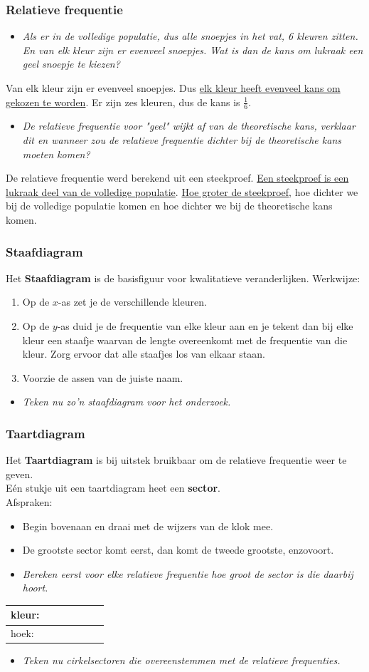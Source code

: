 \documentclass[dutch]{beamer}
\newcommand{\vraag}[1]{\begin{itemize}\item {\it #1}\end{itemize}}
\begin{document}
\begin{frame}
\frametitle{Relatieve frequentie}
\vraag{Als er in de volledige populatie, dus alle snoepjes in het vat, 6 kleuren zitten. En
van elk kleur zijn er evenveel snoepjes. Wat is dan de kans om lukraak een geel snoepje te kiezen?}
\pause
Van elk kleur zijn er evenveel snoepjes. Dus \uline{elk kleur heeft evenveel kans om gekozen te worden}. Er zijn zes kleuren, dus de kans is $\frac{1}{6}$.
\pause
\vraag{De relatieve frequentie voor "geel" wijkt af van de theoretische kans, verklaar dit en wanneer
zou de relatieve frequentie dichter bij de theoretische kans moeten komen?}
\pause
De relatieve frequentie werd berekend uit een steekproef. \uline{Een steekproef is een lukraak deel van de volledige populatie}. \uline{Hoe groter de steekproef}, hoe dichter we bij de volledige populatie komen en hoe dichter we bij de theoretische kans komen.
\end{frame}

\begin{frame}
\frametitle{Staafdiagram}
Het {\bf Staafdiagram} is de basisfiguur voor kwalitatieve veranderlijken.
Werkwijze:
\begin{enumerate}
  \item Op de $x$-as zet je de verschillende kleuren.
\item Op de $y$-as duid je de frequentie van elke kleur aan en je tekent dan bij elke kleur een staafje
waarvan de lengte overeenkomt met de frequentie van die kleur. Zorg ervoor dat alle staafjes
los van elkaar staan.
\item Voorzie de assen van de juiste naam.
\end{enumerate}
\pause
\vraag{Teken nu zo’n staafdiagram voor het onderzoek.}
\end{frame}


\begin{frame}
\frametitle{Taartdiagram}
Het {\bf Taartdiagram} is bij uitstek bruikbaar om de relatieve frequentie weer te geven.\\
Eén stukje uit een taartdiagram heet een {\bf sector}.\\
Afspraken:
\begin{itemize}
  \item Begin bovenaan en draai met de wijzers van de klok mee.
  \item De grootste sector komt eerst, dan komt de tweede
grootste, enzovoort.
\end{itemize}
\pause
\vraag{Bereken eerst voor elke relatieve frequentie hoe groot de sector is die daarbij hoort.}
\begin{center}
  \begin{tabular}{|p{1cm}|p{1cm}|p{1cm}|p{1cm}|p{1cm}|p{1cm}|p{1cm}|}
    \hline
    kleur:\vspace{0.5cm}&&&&&&\\
    \hline
    hoek:\vspace{0.5cm}&&&&&&\\
    \hline
  \end{tabular}
\end{center}
\pause
\vraag{Teken nu cirkelsectoren die overeenstemmen met de relatieve frequenties.}
\end{frame}
\end{document}
